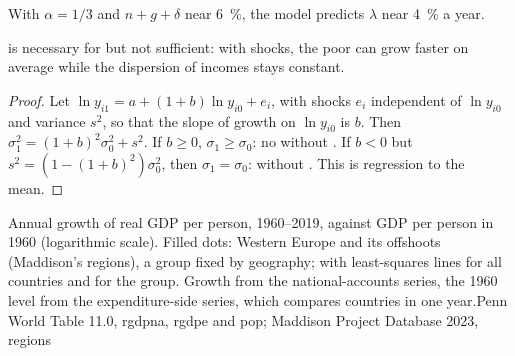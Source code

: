 With $\alpha = 1/3$ and $n + g + \delta$ near 6~\%, the model predicts $\lambda$ near 4~\% a year.

\begin{proposition}\label{prop:b3:growth-empirics:galton}
 is necessary for  but not sufficient: with shocks,
the poor can grow faster on average while the dispersion of incomes stays constant.
\end{proposition}

\begin{proof}
Let $\ln y_{i1} = a + (1 + b)\ln y_{i0} + e_i$, with shocks $e_i$ independent of $\ln y_{i0}$ and variance $s^2$, so that the slope of growth on
$\ln y_{i0}$ is $b$. Then $\sigma_1^2 = (1 + b)^2\sigma_0^2 + s^2$. If $b \ge 0$, $\sigma_1 \ge \sigma_0$: no  without .
If $b < 0$ but $s^2 = (1 - (1 + b)^2)\sigma_0^2$, then $\sigma_1 = \sigma_0$:  without . This is
regression to the mean.
\end{proof}

\begin{omchart}{Annual growth of real GDP per person, 1960--2019, against GDP per person
in 1960 (logarithmic scale). Filled dots: Western Europe and its offshoots (Maddison's
regions), a group fixed by geography; with least-squares lines for all countries and
for the group. Growth from the national-accounts series, the 1960 level from the
expenditure-side series, which compares countries in one year.}{Penn World Table 11.0,
rgdpna, rgdpe and pop; Maddison Project Database 2023, regions}
\end{omchart}

